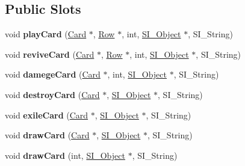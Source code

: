 \subsection*{Public Slots}
\begin{DoxyCompactItemize}
\item 
\mbox{\label{class_field_ac37ae12cc1b0552829f69a9e643290b6}} 
void {\bfseries play\+Card} (\hyperlink{class_card}{Card} $\ast$, \hyperlink{class_card_set}{Row} $\ast$, int, \hyperlink{class_s_i___object}{S\+I\+\_\+\+Object} $\ast$, S\+I\+\_\+\+String)
\item 
\mbox{\label{class_field_a6714bf36ca89295fbc8cbb67b40ecd66}} 
void {\bfseries revive\+Card} (\hyperlink{class_card}{Card} $\ast$, \hyperlink{class_card_set}{Row} $\ast$, int, \hyperlink{class_s_i___object}{S\+I\+\_\+\+Object} $\ast$, S\+I\+\_\+\+String)
\item 
\mbox{\label{class_field_ab5b8e86a9652c2525c454b9a0c095787}} 
void {\bfseries damege\+Card} (\hyperlink{class_card}{Card} $\ast$, int, \hyperlink{class_s_i___object}{S\+I\+\_\+\+Object} $\ast$, S\+I\+\_\+\+String)
\item 
\mbox{\label{class_field_a1465b042369fff1cace5ba4ca33ea105}} 
void {\bfseries destroy\+Card} (\hyperlink{class_card}{Card} $\ast$, \hyperlink{class_s_i___object}{S\+I\+\_\+\+Object} $\ast$, S\+I\+\_\+\+String)
\item 
\mbox{\label{class_field_aaca4a87bed1fcc76a884583e30b55940}} 
void {\bfseries exile\+Card} (\hyperlink{class_card}{Card} $\ast$, \hyperlink{class_s_i___object}{S\+I\+\_\+\+Object} $\ast$, S\+I\+\_\+\+String)
\item 
\mbox{\label{class_field_a3b589256aef1462c3e2583fb61e620fc}} 
void {\bfseries draw\+Card} (\hyperlink{class_card}{Card} $\ast$, \hyperlink{class_s_i___object}{S\+I\+\_\+\+Object} $\ast$, S\+I\+\_\+\+String)
\item 
\mbox{\label{class_field_a40af12fa6a1451a99e5535fcb9b5d15f}} 
void {\bfseries draw\+Card} (int, \hyperlink{class_s_i___object}{S\+I\+\_\+\+Object} $\ast$, S\+I\+\_\+\+String)
\item 
\mbox{\label{class_field_ac43fd2aaa2835716492f763f11317287}} 

\end{DoxyCompactItemize}
